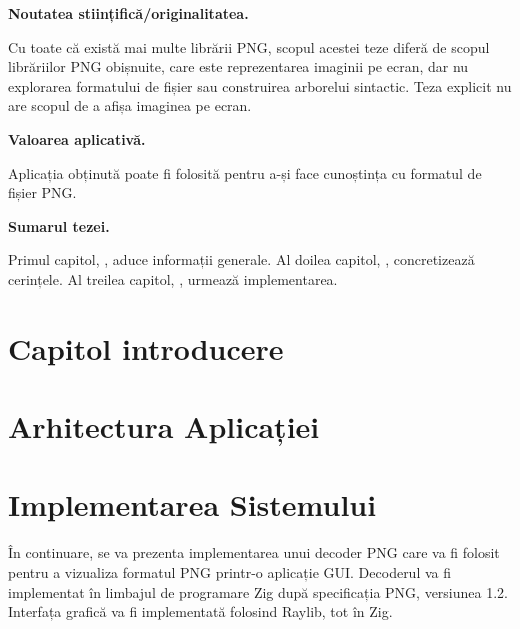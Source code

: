\documentclass[a4paper,12pt]{report}
\begin{document}
\textbf{Noutatea stiințifică/originalitatea.}

Cu toate că există mai multe librării \ac{PNG},
scopul acestei teze diferă de scopul librăriilor \ac{PNG} obișnuite,
care este reprezentarea imaginii pe ecran,
dar nu explorarea formatului de fișier sau construirea arborelui sintactic.
Teza explicit nu are scopul de a afișa imaginea pe ecran.

\textbf{Valoarea aplicativă.}

Aplicația obținută poate fi folosită pentru a-și face cunoștința cu formatul de fișier \ac{PNG}.


\textbf{Sumarul tezei.}

Primul capitol, , aduce informații generale.
Al doilea capitol, , concretizează cerințele.
Al treilea capitol, , urmează implementarea.


\chapter{Capitol introducere}\label{intro_chapter_title}



\chapter{Arhitectura Aplicației}\label{architecture_chapter_title}



\chapter{Implementarea Sistemului}\label{implementation_chapter_title}

În continuare, se va prezenta implementarea unui decoder \ac{PNG} care va fi folosit pentru
a vizualiza formatul \ac{PNG} printr-o aplicație \ac{GUI}.
Decoderul va fi implementat în limbajul de programare Zig\cite{zig}
după specificația \ac{PNG}, versiunea 1.2\cite{png_spec}.
Interfața grafică va fi implementată folosind Raylib\cite{raylib}, tot în Zig.
\end{document}
